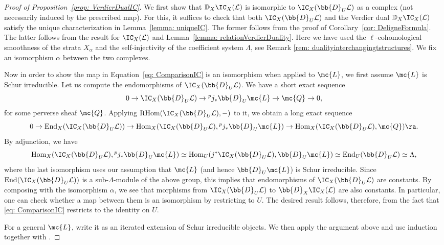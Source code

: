 \documentclass[letterpaper,11pt]{amsart}
\begin{document}
\begin{proof}[Proof of Proposition~\ref{prop: VerdierDualIC}]
We first show that $\mathbb{D}_{X}\IC_{X}(\mathcal{L})$ is isomorphic to $\IC_{X}(\bb{D}_{U}\mathcal{L})$ as a complex (not necessarily induced by the prescribed map). For this, it suffices to check that both $\IC_{X}(\bb{D}_{U}\mathcal{L})$ and the Verdier dual $\mathbb{D}_{X}\IC_{X}(\mathcal{L})$ satisfy the unique characterization in Lemma~\ref{lemma: uniqueIC}. The former follows from the proof of Corollary~\ref{cor: DeligneFormula}. The latter follows from the result for $\IC_X(\mathcal{L})$ and Lemma~\ref{lemma: relationVerdierDuality}. Here we have used the $\ell$-cohomological smoothness of the strata $X_{\alpha}$ and the self-injectivity of the coefficient system $\Lambda$, see Remark \ref{rem: dualityinterchangingtstructures}. We fix an isomorphism $\alpha$ between the two complexes.

Now in order to show the map in Equation~\eqref{eq: ComparisonIC} is an isomorphism when applied to $\mc{L}$, we first assume $\mc{L}$ is Schur irreducible. Let us compute the endomorphisms of $\IC_{X}(\bb{D}_{U}\mathcal{L})$. We have a short exact sequence
\[0\to \IC_{X}(\bb{D}_{U}\mathcal{L})\to {}^pj_\ast \bb{D}_U\mc{L}\to \mc{Q}\to 0,\]
for some perverse sheaf $\mc{Q}$. Applying $\operatorname{RHom}(\IC_{X}(\bb{D}_{U}\mathcal{L}),-)$ to it, we obtain a long exact sequence
\[0\to \operatorname{End}_{X}(\IC_{X}(\bb{D}_{U}\mathcal{L}))\to \operatorname{Hom}_{X}(\IC_{X}(\bb{D}_{U}\mathcal{L}),{}^pj_\ast\bb{D}_U\mc{L})\to \operatorname{Hom}_{X}(\IC_{X}(\bb{D}_{U}\mathcal{L}),\mc{Q}) \ra.\]
By adjunction, we have 
\[\operatorname{Hom}_X(\IC_{X}(\bb{D}_{U}\mathcal{L}),{}^pj_\ast\bb{D}_U\mc{L})\simeq \operatorname{Hom}_U(j^\ast\IC_{X}(\bb{D}_{U}\mathcal{L}),\bb{D}_U\mc{L})\simeq \operatorname{End}_U(\bb{D}_{U}\mathcal{L})\simeq \Lambda,\]
where the last isomorphism uses our assumption that $\mc{L}$ (and hence $\bb{D}_U \mc{L}$) is Schur irreducible. Since $\operatorname{End}(\IC_{X}(\bb{D}_{U}\mathcal{L}))$ is a sub-$\Lambda$-module of the above group, this implies that endomorphisms of $\IC_{X}(\bb{D}_{U}\mathcal{L})$ are constants. By composing with the isomorphism $\alpha$, we see that morphisms from $\IC_{X}(\bb{D}_{U}\mathcal{L})$ to $\bb{D}_X\IC_{X}(\mathcal{L})$ are also constants. In particular, one can check whether a map between them is an isomorphism by restricting to $U$. The desired result follows, therefore, from the fact that \eqref{eq: ComparisonIC} restricts to the identity on $U$.

For a general $\mc{L}$, write it as an iterated extension of Schur irreducible objects. We then apply the argument above and use induction together with \cite[Tag~014A]{stacks-project}.
\end{proof}   
\end{document}
